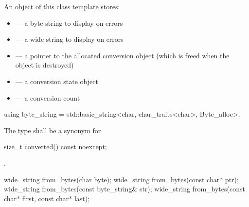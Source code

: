 \pnum
An object of this class template stores:

\begin{itemize}
\item {} --- a byte string to display on errors
\item {} --- a wide string to display on errors
\item {} --- a pointer to the allocated conversion object
(which is freed when the  object is destroyed)
\item {} --- a conversion state object
\item {} --- a conversion count
\end{itemize}

%
%
\begin{itemdecl}
using byte_string = std::basic_string<char, char_traits<char>, Byte_alloc>;
\end{itemdecl}

\begin{itemdescr}
\pnum
The type shall be a synonym for 
\end{itemdescr}

%
%
\begin{itemdecl}
size_t converted() const noexcept;
\end{itemdecl}

\begin{itemdescr}
\pnum
\returns {}.
\end{itemdescr}

%
%
\begin{itemdecl}
wide_string from_bytes(char byte);
wide_string from_bytes(const char* ptr);
wide_string from_bytes(const byte_string& str);
wide_string from_bytes(const char* first, const char* last);
\end{itemdecl}

